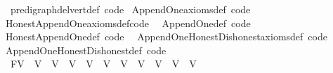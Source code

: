 \begin{isabellebody}
\endisatagproof
{\isafoldproof}%
%
\isadelimproof
\isanewline
%
\endisadelimproof
{}\isamarkupfalse%
%
\isadelimdocument
%
\endisadelimdocument
%
\isatagdocument
%
\isamarkuptrue%
%
\endisatagdocument
{\isafolddocument}%
%
\isadelimdocument
%
\endisadelimdocument
{}\isamarkupfalse%
\ \ pre{\isacharunderscore}{\kern0pt}digraph{\isachardot}{\kern0pt}del{\isacharunderscore}{\kern0pt}vert{\isacharunderscore}{\kern0pt}def\ {\isacharbrackleft}{\kern0pt}code{\isacharbrackright}{\kern0pt}\isanewline
{}\isamarkupfalse%
\ Append{\isacharunderscore}{\kern0pt}One{\isacharunderscore}{\kern0pt}axioms{\isacharunderscore}{\kern0pt}def\ {\isacharbrackleft}{\kern0pt}code{\isacharbrackright}{\kern0pt}\ \isanewline
{}\isamarkupfalse%
\ Honest{\isacharunderscore}{\kern0pt}Append{\isacharunderscore}{\kern0pt}One{\isacharunderscore}{\kern0pt}axioms{\isacharunderscore}{\kern0pt}def{\isacharbrackleft}{\kern0pt}code{\isacharbrackright}{\kern0pt}\ \isanewline
{}\isamarkupfalse%
\ Append{\isacharunderscore}{\kern0pt}One{\isacharunderscore}{\kern0pt}def\ {\isacharbrackleft}{\kern0pt}code{\isacharbrackright}{\kern0pt}\ \isanewline
{}\isamarkupfalse%
\ Honest{\isacharunderscore}{\kern0pt}Append{\isacharunderscore}{\kern0pt}One{\isacharunderscore}{\kern0pt}def\ {\isacharbrackleft}{\kern0pt}code{\isacharbrackright}{\kern0pt}\ \isanewline
{}\isamarkupfalse%
\ Append{\isacharunderscore}{\kern0pt}One{\isacharunderscore}{\kern0pt}Honest{\isacharunderscore}{\kern0pt}Dishonest{\isacharunderscore}{\kern0pt}axioms{\isacharunderscore}{\kern0pt}def\ {\isacharbrackleft}{\kern0pt}code{\isacharbrackright}{\kern0pt}\isanewline
{}\isamarkupfalse%
\ Append{\isacharunderscore}{\kern0pt}One{\isacharunderscore}{\kern0pt}Honest{\isacharunderscore}{\kern0pt}Dishonest{\isacharunderscore}{\kern0pt}def\ {\isacharbrackleft}{\kern0pt}code{\isacharbrackright}{\kern0pt}%
\isadelimdocument
%
\endisadelimdocument
%
\isatagdocument
%
\isamarkuptrue%
%
\endisatagdocument
{\isafolddocument}%
%
\isadelimdocument
%
\endisadelimdocument
{}\isamarkupfalse%
\ \ FV\ {\isacharequal}{\kern0pt}\ V{}\ {\isacharbar}{\kern0pt}\ V{}\ {\isacharbar}{\kern0pt}\ V{}\ {\isacharbar}{\kern0pt}\ V{}\ {\isacharbar}{\kern0pt}\ V{}\ {\isacharbar}{\kern0pt}\ V{}\ {\isacharbar}{\kern0pt}\ V{}\ {\isacharbar}{\kern0pt}\ V{}\ {\isacharbar}{\kern0pt}\ V{}\ {\isacharbar}{\kern0pt}\ V{}{}\isanewline

\end{isabellebody}
